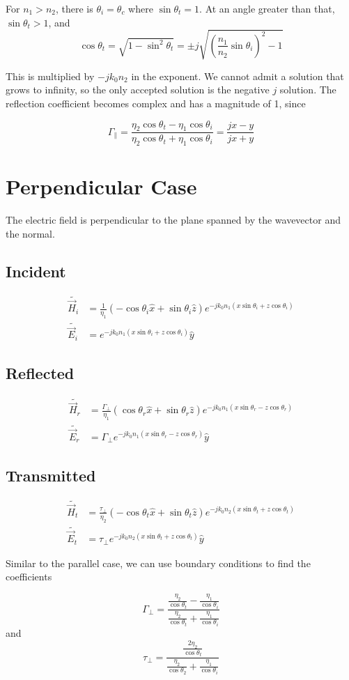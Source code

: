 \documentclass[12pt]{article}
\begin{document}
For $n_1 > n_2$, there is $\theta_i = \theta_c$ where $\sin\theta_t = 1$. At an angle greater than that, $\sin\theta_t > 1$, and
$$\cos\theta_t = \sqrt{1 - \sin^2\theta_t} = \pm j\sqrt{\left(\frac{n_1}{n_2}\sin\theta_i\right)^2 - 1}$$

This is multiplied by $-jk_0n_2$ in the exponent. We cannot admit a solution that grows to infinity, so the only accepted solution is the negative $j$ solution. The reflection coefficient becomes complex and has a magnitude of 1, since

$$\Gamma_\parallel = \frac{\eta_2\cos\theta_t - \eta_1\cos\theta_i}{\eta_2\cos\theta_t + \eta_1\cos\theta_i} = \frac{jx - y}{jx + y}$$

\section{Perpendicular Case}

The electric field is perpendicular to the plane spanned by the wavevector and the normal.

\subsection{Incident}

\begin{align*}
    \tilde{\vec H_i} &= \frac{1}{\eta_1} (-\cos\theta_i\hat x + \sin\theta_i\hat z) e^{-jk_0n_1(x\sin\theta_i + z\cos\theta_i)} \\
    \tilde{\vec E_i} &= e^{-jk_0n_1(x\sin\theta_i + z\cos\theta_i)} \hat y
\end{align*}

\subsection{Reflected}

\begin{align*}
    \tilde{\vec H_r} &= \frac{\Gamma_\perp}{\eta_1} (\cos\theta_r \hat x + \sin\theta_r\hat z)e^{-jk_0n_1(x\sin\theta_r - z\cos\theta_r)} \\
    \tilde{\vec E_r} &= \Gamma_\perp e^{-jk_0n_1(x\sin\theta_r - z\cos\theta_r)}\hat y
\end{align*}

\subsection{Transmitted}

\begin{align*}
    \tilde{\vec H_t} &= \frac{\tau_\perp}{\eta_2} (-\cos\theta_t \hat x + \sin\theta_t \hat z)e^{-jk_0n_2(x\sin\theta_t + z\cos\theta_t)} \\
    \tilde{\vec E_t} &= \tau_\perp e^{-jk_0n_2(x\sin\theta_t + z\cos\theta_t)}\hat y
\end{align*}

Similar to the parallel case, we can use boundary conditions to find the coefficients

$$\Gamma_\perp = \frac{\frac{\eta_2}{\cos\theta_t} - \frac{\eta_1}{\cos\theta_i}}{\frac{\eta_2}{\cos\theta_t} + \frac{\eta_1}{\cos\theta_i}}$$
and
$$\tau_\perp = \frac{\frac{2\eta_2}{\cos\theta_t}}{\frac{\eta_2}{\cos\theta_2} + \frac{\eta_1}{\cos\theta_i}}$$
\end{document}
